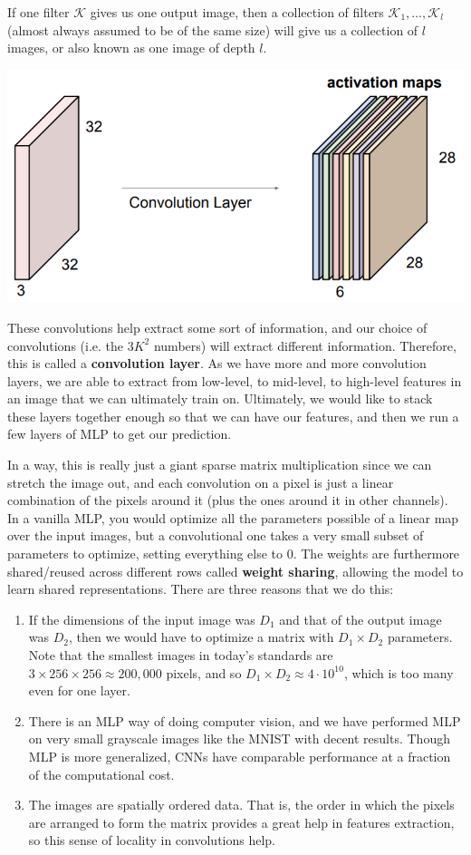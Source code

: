 \documentclass{article}
\theoremstyle{definition}
\theoremstyle{remark}
\theoremstyle{definition}
\begin{document}
If one filter $\mathcal{K}$ gives us one output image, then a collection of filters $\mathcal{K}_1, \ldots, \mathcal{K}_l$ (almost always assumed to be of the same size) will give us a collection of $l$ images, or also known as one image of depth $l$. 
\begin{center}
    \includegraphics[scale=0.3]{Images/CNNs/kernel3.png}
\end{center}
These convolutions help extract some sort of information, and our choice of convolutions (i.e. the $3K^2$ numbers) will extract different information. Therefore, this is called a \textbf{convolution layer}. As we have more and more convolution layers, we are able to extract from low-level, to mid-level, to high-level features in an image that we can ultimately train on. Ultimately, we would like to stack these layers together enough so that we can have our features, and then we run a few layers of MLP to get our prediction. 


In a way, this is really just a giant sparse matrix multiplication since we can stretch the image out, and each convolution on a pixel is just a linear combination of the pixels around it (plus the ones around it in other channels). In a vanilla MLP, you would optimize all the parameters possible of a linear map over the input images, but a convolutional one takes a very small subset of parameters to optimize, setting everything else to $0$. The weights are furthermore shared/reused across different rows called \textbf{weight sharing}, allowing the model to learn shared representations. There are three reasons that we do this: 
\begin{enumerate}
    \item If the dimensions of the input image was $D_1$ and that of the output image was $D_2$, then we would have to optimize a matrix with $D_1 \times D_2$ parameters. Note that the smallest images in today's standards are $3 \times 256 \times 256 \approx 200,000$ pixels, and so $D_1 \times D_2 \approx 4 \cdot 10^{10}$, which is too many even for one layer. 
    \item There is an MLP way of doing computer vision, and we have performed MLP on very small grayscale images like the MNIST with decent results. Though MLP is more generalized, CNNs have comparable performance at a fraction of the computational cost. 
    \item The images are spatially ordered data. That is, the order in which the pixels are arranged to form the matrix provides a great help in features extraction, so this sense of locality in convolutions help. 
\end{enumerate}
\end{document}
